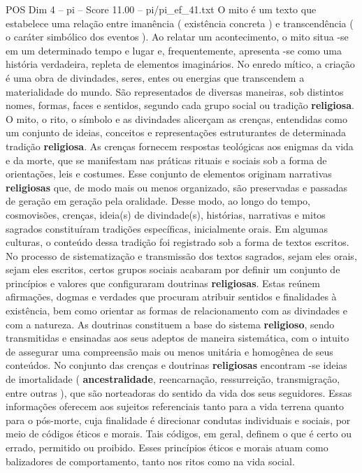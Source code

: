 \begin{textsample}{POS Dim 4 – pi – Score 11.00 – pi/pi\_ef\_41.txt}
O mito é um texto que estabelece uma relação entre imanência ( existência concreta ) e transcendência ( o caráter simbólico dos eventos ).
Ao relatar um acontecimento, o mito situa -se em um determinado tempo e lugar e, frequentemente, apresenta -se como uma história verdadeira, repleta de elementos imaginários.
No enredo mítico, a criação é uma obra de divindades, seres, entes ou energias que transcendem a materialidade do mundo.
São representados de diversas maneiras, sob distintos nomes, formas, faces e sentidos, segundo cada grupo social ou tradição \textbf{religiosa}.
O mito, o rito, o símbolo e as divindades alicerçam as crenças, entendidas como um conjunto de ideias, conceitos e representações estruturantes de determinada tradição \textbf{religiosa}.
As crenças fornecem respostas teológicas aos enigmas da vida e da morte, que se manifestam nas práticas rituais e sociais sob a forma de orientações, leis e costumes.
Esse conjunto de elementos originam narrativas \textbf{religiosas} que, de modo mais ou menos organizado, são preservadas e passadas de geração em geração pela oralidade.
Desse modo, ao longo do tempo, cosmovisões, crenças, ideia(s) de divindade(s), histórias, narrativas e mitos sagrados constituíram tradições específicas, inicialmente orais.
Em algumas culturas, o conteúdo dessa tradição foi registrado sob a forma de textos escritos.
No processo de sistematização e transmissão dos textos sagrados, sejam eles orais, sejam eles escritos, certos grupos sociais acabaram por definir um conjunto de princípios e valores que configuraram doutrinas \textbf{religiosas}.
Estas reúnem afirmações, dogmas e verdades que procuram atribuir sentidos e finalidades à existência, bem como orientar as formas de relacionamento com as divindades e com a natureza.
As doutrinas constituem a base do sistema \textbf{religioso}, sendo transmitidas e ensinadas aos seus adeptos de maneira sistemática, com o intuito de assegurar uma compreensão mais ou menos unitária e homogênea de seus conteúdos.
No conjunto das crenças e doutrinas \textbf{religiosas} encontram -se ideias de imortalidade ( \textbf{ancestralidade}, reencarnação, ressurreição, transmigração, entre outras ), que são norteadoras do sentido da vida dos seus seguidores.
Essas informações oferecem aos sujeitos referenciais tanto para a vida terrena quanto para o pós-morte, cuja finalidade é direcionar condutas individuais e sociais, por meio de códigos éticos e morais.
Tais códigos, em geral, definem o que é certo ou errado, permitido ou proibido.
Esses princípios éticos e morais atuam como balizadores de comportamento, tanto nos ritos como na vida social.

\end{textsample}
